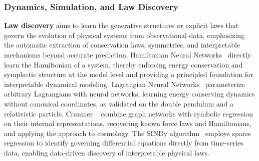 \subsubsection{Dynamics, Simulation, and Law Discovery}

\textbf{Law discovery} aims to learn the generative structures or explicit laws that govern the evolution of physical systems from observational data, emphasizing the automatic extraction of conservation laws, symmetries, and interpretable mechanisms beyond accurate prediction.
Hamiltonian Neural Networks~\cite{greydanus2019hamiltonian} directly learn the Hamiltonian of a system, thereby enforcing energy conservation and symplectic structure at the model level and providing a principled foundation for interpretable dynamical modeling.
Lagrangian Neural Networks~\cite{cranmer2020lagrangian} parameterize arbitrary Lagrangians with neural networks, learning energy conserving dynamics without canonical coordinates, as validated on the double pendulum and a relativistic particle.
Cranmer \etal~\cite{cranmer2020discovering} combine graph networks with symbolic regression on their internal representations, recovering known force laws and Hamiltonians, and applying the approach to cosmology.
The SINDy algorithm~\cite{brunton2016discovering} employs sparse regression to identify governing differential equations directly from time-series data, enabling data-driven discovery of interpretable physical laws.

